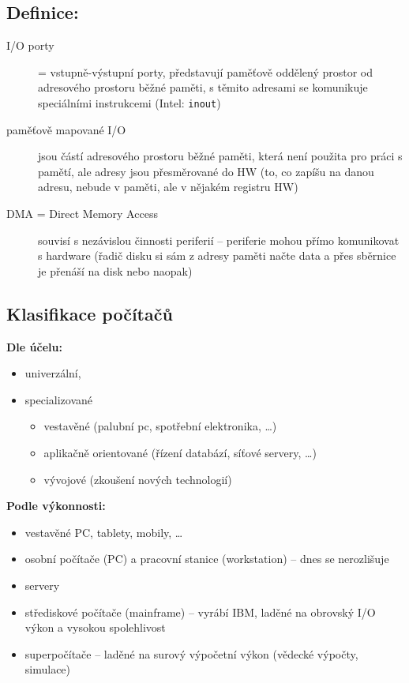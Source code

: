 \documentclass[a4paper, 11pt]{article}
\begin{document}
\subsection*{Definice:} \label{i-o}
\begin{description}
\item[I/O porty] = vstupně-výstupní porty, představují paměťově oddělený prostor od adresového prostoru běžné paměti, s těmito adresami se komunikuje speciálními instrukcemi (Intel: \verb|inout|)

\item[paměťově mapované I/O] jsou částí adresového prostoru běžné paměti, která není použita pro práci s pamětí, ale adresy jsou přesměrované do HW (to, co zapíšu na danou adresu, nebude v paměti, ale v nějakém registru HW)

\item[DMA = Direct Memory Access] souvisí s nezávislou činnosti periferií -- periferie mohou přímo komunikovat s hardware (řadič disku si sám z adresy paměti načte data a přes sběrnice je přenáší na disk nebo naopak)
\end{description}

\subsection{Klasifikace počítačů}

\textbf{Dle účelu:}
\begin{itemize}
    \item univerzální,
    \item specializované
    \begin{itemize}
        \item vestavěné (palubní pc, spotřební elektronika, \ldots)
        \item aplikačně orientované (řízení databází, síťové servery, \ldots)
        \item vývojové (zkoušení nových technologií)
    \end{itemize}
\end{itemize}

\textbf{Podle výkonnosti:}
\begin{itemize}
    \item vestavěné PC, tablety, mobily, \ldots
    \item osobní počítače (PC) a pracovní stanice (workstation) -- dnes se nerozlišuje
    \item servery
    \item střediskové počítače (mainframe) -- vyrábí IBM, laděné na obrovský I/O výkon a vysokou spolehlivost
    \item superpočítače -- laděné na surový výpočetní výkon (vědecké výpočty, simulace)
\end{itemize}
\end{document}
